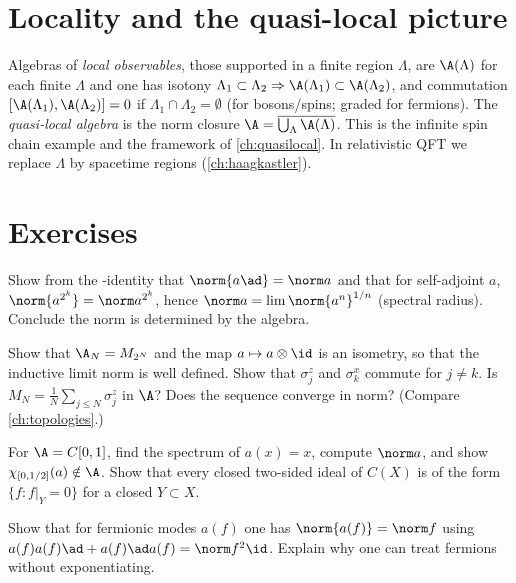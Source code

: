 \section{Locality and the quasi-local picture}

Algebras of \emph{local observables}, those supported in a finite region $\Lambda$, are $\A(\Lambda)$ for each finite $\Lambda$ and one has isotony $\Lambda_1\subset\Lambda_2\Rightarrow\A(\Lambda_1)\subset\A(\Lambda_2)$, and commutation $[\A(\Lambda_1),\A(\Lambda_2)]=0$ if $\Lambda_1\cap\Lambda_2=\emptyset$ (for bosons/spins; graded for fermions). The \emph{quasi-local algebra} is the norm closure $\A=\overline{\bigcup_\Lambda\A(\Lambda)}$. This is the infinite spin chain example and the framework of \cref{ch:quasilocal}. In relativistic QFT we replace $\Lambda$ by spacetime regions (\cref{ch:haagkastler}).

\section*{Exercises}
\begin{exercise}
Show from the \cstar-identity that $\norm{a\ad}=\norm a$ and that for self-adjoint $a$, $\norm{a^{2^k}}=\norm a^{2^k}$, hence $\norm a=\lim\norm{a^n}^{1/n}$ (spectral radius). Conclude the norm is determined by the algebra.
\end{exercise}
\begin{exercise}
Show that $\A_N=M_{2^N}$ and the map $a\mapsto a\otimes\id$ is an isometry, so that the inductive limit norm is well defined. Show that $\sigma^z_j$ and $\sigma^x_k$ commute for $j\ne k$. Is $M_N=\frac1N\sum_{j\le N}\sigma_j^z$ in $\A$? Does the sequence converge in norm? (Compare \cref{ch:topologies}.)
\end{exercise}
\begin{exercise}
For $\A=C[0,1]$, find the spectrum of $a(x)=x$, compute $\norm a$, and show $\chi_{[0,1/2]}(a)\notin\A$. Show that every closed two-sided ideal of $C(X)$ is of the form $\{f:f|_Y=0\}$ for a closed $Y\subset X$.
\end{exercise}
\begin{exercise}
Show that for fermionic modes $a(f)$ one has $\norm{a(f)}=\norm f$ using $a(f)a(f)\ad+a(f)\ad a(f)=\norm f^2\id$. Explain why one can treat fermions without exponentiating.
\end{exercise}
